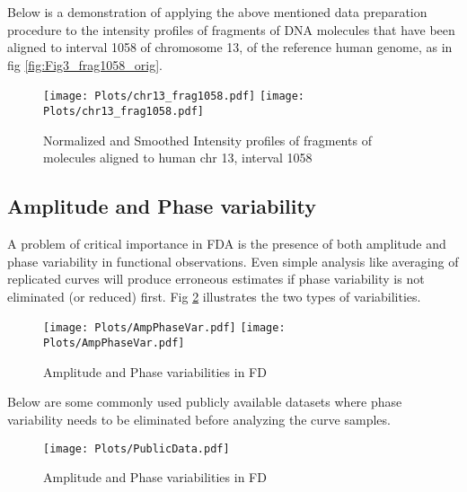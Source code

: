 Below is a demonstration of applying the above mentioned data preparation procedure to the intensity profiles of fragments of DNA molecules that have been aligned to interval 1058 of chromosome 13, of the reference human genome, as in fig \ref{fig:Fig3_frag1058_orig}.
\begin{figure}[H]
\begin{center}
\texttt{[image: Plots/chr13\_frag1058.pdf]}
\texttt{[image: Plots/chr13\_frag1058.pdf]}
\end{center}
\caption{Normalized and Smoothed Intensity profiles of fragments of molecules aligned to human chr 13, interval 1058}
\label{fig:Fig3_frag1058_norm}
\end{figure}


\subsection{Amplitude and Phase variability} \label{Sec_AmpPhase}
A problem of critical importance in FDA is the presence of both amplitude and phase variability in functional observations. Even simple analysis like averaging of replicated curves will produce erroneous estimates if phase variability is not eliminated (or reduced) first. Fig \ref{fig:Fig3_AmpPhase} illustrates the two types of variabilities. 
\begin{figure}[H]
\begin{center}
\texttt{[image: Plots/AmpPhaseVar.pdf]}
\texttt{[image: Plots/AmpPhaseVar.pdf]}
\end{center}
\caption{Amplitude and Phase variabilities in FD}
\label{fig:Fig3_AmpPhase}
\end{figure}
Below are some commonly used publicly available datasets where phase variability needs to be eliminated before analyzing the curve samples. 
\begin{figure}[H]
\begin{center}
\texttt{[image: Plots/PublicData.pdf]}
\end{center}
\caption{Amplitude and Phase variabilities in FD}
\label{fig:Fig3_growthM}
\end{figure}

